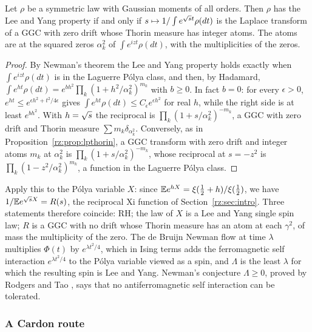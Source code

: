\begin{proposition}\label{rz:prop:newmanthorin}
Let $\rho$ be a symmetric law with Gaussian moments of all orders. Then $\rho$ has the Lee and Yang property if and only if $s\mapsto1/\int e^{\sqrt{s} t}\rho(dt)$ is the Laplace transform of a GGC with zero drift whose Thorin measure has integer atoms. The atoms are at the squared zeros $\alpha_k^2$ of $\int e^{izt}\rho(dt)$, with the multiplicities of the zeros.
\end{proposition}

\begin{proof}
By Newman's theorem \cite{Newman74} the Lee and Yang property holds exactly when $\int e^{izt}\rho(dt)$ is in the Laguerre P\'olya class, and then, by Hadamard, $\int e^{ht}\rho(dt)=e^{bh^2}\prod_k(1+h^2/\alpha_k^2)^{m_k}$ with $b\ge0$. In fact $b=0$: for every $\epsilon>0$, $e^{ht}\le e^{\epsilon h^2+t^2/4\epsilon}$ gives $\int e^{ht}\rho(dt)\le C_\epsilon e^{\epsilon h^2}$ for real $h$, while the right side is at least $e^{bh^2}$. With $h=\sqrt{s}$ the reciprocal is $\prod_k(1+s/\alpha_k^2)^{-m_k}$, a GGC with zero drift and Thorin measure $\sum m_k\delta_{\alpha_k^2}$. Conversely, as in Proposition~\ref{rz:prop:lpthorin}, a GGC transform with zero drift and integer atoms $m_k$ at $\alpha_k^2$ is $\prod_k(1+s/\alpha_k^2)^{-m_k}$, whose reciprocal at $s=-z^2$ is $\prod_k(1-z^2/\alpha_k^2)^{m_k}$, a function in the Laguerre P\'olya class.
\end{proof}

Apply this to the P\'olya variable $X$: since $\mathbb{E} e^{hX}=\xi(\frac12+h)/\xi(\frac12)$, we have $1/\mathbb{E} e^{\sqrt{s} X}=R(s)$, the reciprocal Xi function of Section~\ref{rz:sec:intro}. Three statements therefore coincide: RH; the law of $X$ is a Lee and Yang single spin law; $R$ is a GGC with no drift whose Thorin measure has an atom at each $\gamma^2$, of mass the multiplicity of the zero. The de Bruijn Newman flow at time $\lambda$ multiplies $\Phi(t)$ by $e^{\lambda t^2/4}$, which in Ising terms adds the ferromagnetic self interaction $e^{\lambda t^2/4}$ to the P\'olya variable viewed as a spin, and $\Lambda$ is the least $\lambda$ for which the resulting spin is Lee and Yang. Newman's conjecture $\Lambda\ge0$, proved by Rodgers and Tao \cite{RodgersTao}, says that no antiferromagnetic self interaction can be tolerated.

\subsubsection{A Cardon route}

